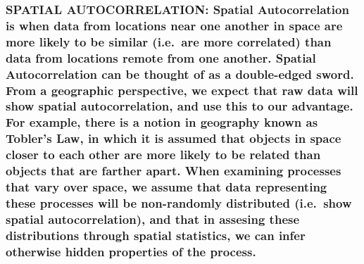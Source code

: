 \documentclass[
  12pt,
]{article}
\begin{document}
\hypertarget{spatial-autocorrelation-spatial-autocorrelation-is-when-data-from-locations-near-one-another-in-space-are-more-likely-to-be-similar-i.e.-are-more-correlated-than-data-from-locations-remote-from-one-another.-spatial-autocorrelation-can-be-thought-of-as-a-double-edged-sword.-from-a-geographic-perspective-we-expect-that-raw-data-will-show-spatial-autocorrelation-and-use-this-to-our-advantage.-for-example-there-is-a-notion-in-geography-known-as-toblers-law-in-which-it-is-assumed-that-objects-in-space-closer-to-each-other-are-more-likely-to-be-related-than-objects-that-are-farther-apart.-when-examining-processes-that-vary-over-space-we-assume-that-data-representing-these-processes-will-be-non-randomly-distributed-i.e.-show-spatial-autocorrelation-and-that-in-assesing-these-distributions-through-spatial-statistics-we-can-infer-otherwise-hidden-properties-of-the-process.}{%
\subsubsection{SPATIAL AUTOCORRELATION: Spatial Autocorrelation is when
data from locations near one another in space are more likely to be
similar (i.e.~are more correlated) than data from locations remote from
one another. Spatial Autocorrelation can be thought of as a double-edged
sword. From a geographic perspective, we expect that raw data will show
spatial autocorrelation, and use this to our advantage. For example,
there is a notion in geography known as Tobler's Law, in which it is
assumed that objects in space closer to each other are more likely to be
related than objects that are farther apart. When examining processes
that vary over space, we assume that data representing these processes
will be non-randomly distributed (i.e.~show spatial autocorrelation),
and that in assesing these distributions through spatial statistics, we
can infer otherwise hidden properties of the
process.}\label{spatial-autocorrelation-spatial-autocorrelation-is-when-data-from-locations-near-one-another-in-space-are-more-likely-to-be-similar-i.e.-are-more-correlated-than-data-from-locations-remote-from-one-another.-spatial-autocorrelation-can-be-thought-of-as-a-double-edged-sword.-from-a-geographic-perspective-we-expect-that-raw-data-will-show-spatial-autocorrelation-and-use-this-to-our-advantage.-for-example-there-is-a-notion-in-geography-known-as-toblers-law-in-which-it-is-assumed-that-objects-in-space-closer-to-each-other-are-more-likely-to-be-related-than-objects-that-are-farther-apart.-when-examining-processes-that-vary-over-space-we-assume-that-data-representing-these-processes-will-be-non-randomly-distributed-i.e.-show-spatial-autocorrelation-and-that-in-assesing-these-distributions-through-spatial-statistics-we-can-infer-otherwise-hidden-properties-of-the-process.}}
\end{document}
